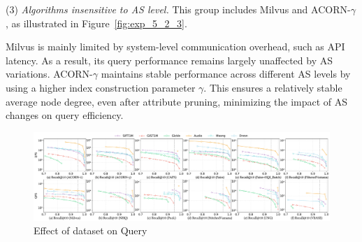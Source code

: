 \documentclass[sigconf, nonacm]{acmart}
\begin{document}
\begin{sloppypar}
\par
(3) \textit{Algorithms insensitive to AS level.}  
This group includes Milvus and ACORN-\(\gamma\), as illustrated in Figure~\ref{fig:exp_5_2_3}.

Milvus is mainly limited by system-level communication overhead, such as API latency. As a result, its query performance remains largely unaffected by AS variations. ACORN-\(\gamma\) maintains stable performance across different AS levels by using a higher index construction parameter $\gamma$. This ensures a relatively stable average node degree, even after attribute pruning, minimizing the impact of AS changes on query efficiency.

\begin{figure}
    \centering
    \setlength{\abovecaptionskip}{0cm}
    \setlength{\belowcaptionskip}{-0.4cm}
    \includegraphics[width=\textwidth]{figures/exp/exp_6_1.pdf}
    \caption{Effect of dataset on Query}
    \label{fig:exp_6_1}
\end{figure}


\begin{table}[t]
\centering
\setlength{\abovecaptionskip}{0.05cm}
\caption{Time and space overhead of range filtering index construction}
\label{tab:Range Filtered}
\end{table}


\end{sloppypar}
\end{document}
